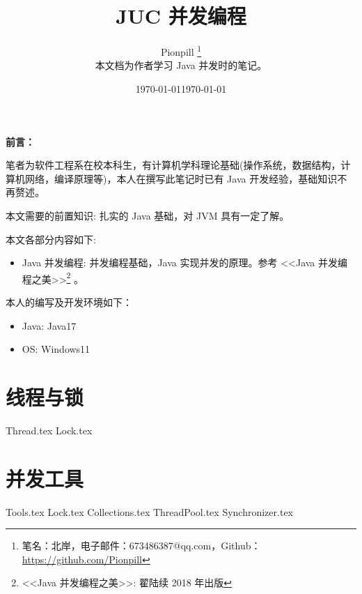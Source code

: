 \documentclass{PionpillNote-book}
\title{JUC 并发编程}
\author{
    Pionpill \footnote{笔名：北岸，电子邮件：673486387@qq.com，Github：\url{https://github.com/Pionpill}} \\
    本文档为作者学习 Java 并发时的笔记。\\
}
\date{\today}
\begin{document}
\pagestyle{plain}
\maketitle

\noindent\textbf{前言：}

笔者为软件工程系在校本科生，有计算机学科理论基础(操作系统，数据结构，计算机网络，编译原理等)，本人在撰写此笔记时已有 Java 开发经验，基础知识不再赘述。

本文需要的前置知识: 扎实的 Java 基础，对 JVM 具有一定了解。

本文各部分内容如下:
\begin{itemize}
    \item Java 并发编程: 并发编程基础，Java 实现并发的原理。参考 <<Java 并发编程之美>>\footnote{<<Java 并发编程之美>>: 翟陆续 2018 年出版} 。
\end{itemize}

本人的编写及开发环境如下：
\begin{itemize}
    \item Java: Java17
    \item OS: Windows11
\end{itemize}

\date{\today}
\newpage

\tableofcontents

\newpage

\setcounter{page}{1} 
\pagestyle{fancy}

\chapter{线程与锁}
{Thread.tex}
{Lock.tex}

\chapter{并发工具}
{Tools.tex}
{Lock.tex}
{Collections.tex}
{ThreadPool.tex}
{Synchronizer.tex}
\end{document}
